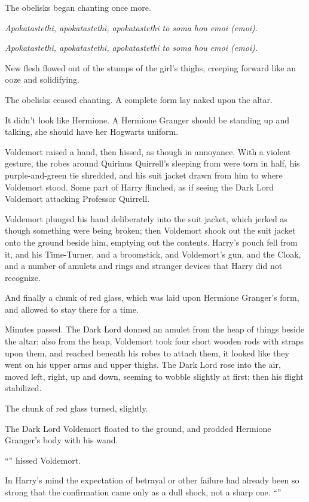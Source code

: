 The obelisks began chanting once more.

\emph{Apokatastethi, apokatastethi, apokatastethi to soma hou emoi (emoi).}

\emph{Apokatastethi, apokatastethi, apokatastethi to soma hou emoi (emoi).}

New flesh flowed out of the stumps of the girl’s thighs, creeping forward like an ooze and solidifying.

The obelisks ceased chanting. A complete form lay naked upon the altar.

It didn’t look like Hermione. A Hermione Granger should be standing up and talking, she should have her Hogwarts uniform.

Voldemort raised a hand, then hissed, as though in annoyance. With a violent gesture, the robes around Quirinus Quirrell’s sleeping from were torn in half, his purple-and-green tie shredded, and his suit jacket drawn from him to where Voldemort stood. Some part of Harry flinched, as if seeing the Dark Lord Voldemort attacking Professor Quirrell.

Voldemort plunged his hand deliberately into the suit jacket, which jerked as though something were being broken; then Voldemort shook out the suit jacket onto the ground beside him, emptying out the contents. Harry’s pouch fell from it, and his Time-Turner, and a broomstick, and Voldemort’s gun, and the Cloak, and a number of amulets and rings and stranger devices that Harry did not recognize.

And finally a chunk of red glass, which was laid upon Hermione Granger’s form, and allowed to stay there for a time.

Minutes passed. The Dark Lord donned an amulet from the heap of things beside the altar; also from the heap, Voldemort took four short wooden rods with straps upon them, and reached beneath his robes to attach them, it looked like they went on his upper arms and upper thighs. The Dark Lord rose into the air, moved left, right, up and down, seeming to wobble slightly at first; then his flight stabilized.

The chunk of red glass turned, slightly.

The Dark Lord Voldemort floated to the ground, and prodded Hermione Granger’s body with his wand.

“” hissed Voldemort.

In Harry’s mind the expectation of betrayal or other failure had already been so strong that the confirmation came only as a dull shock, not a sharp one. “”

